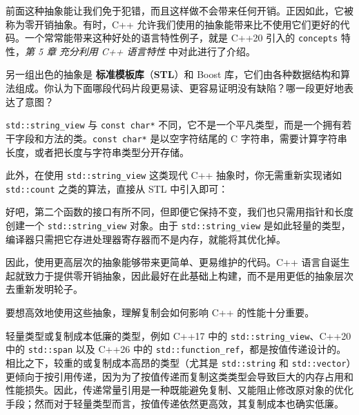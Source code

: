 前面这种抽象能让我们免于犯错，而且这样做不会带来任何开销。正因如此，它被称为零开销抽象。有时，C++ 允许我们使用的抽象能带来比不使用它们更好的代码。一个常常能带来这种好处的语言特性例子，就是 C++20 引入的 \texttt{concepts} 特性，\emph{第 5 章} \emph{充分利用 C++ 语言特性} 中对此进行了介绍。

\label{idx:030}
另一组出色的抽象是 \textbf{标准模板库}（\textbf{STL}）和 Boost 库，它们由各种数据结构和算法组成。你认为下面哪段代码片段更易读、更容易证明没有缺陷？哪一段更好地表达了意图？

\texttt{std::\allowbreak{}string\_\allowbreak{}view} 与 \texttt{const char*} 不同，它不是一个平凡类型，而是一个拥有若干字段和方法的类。\texttt{const char*} 是以空字符结尾的 C 字符串，需要计算字符串长度，或者把长度与字符串类型分开存储。

\label{idx:031}
此外，在使用 \texttt{std::\allowbreak{}string\_\allowbreak{}view} 这类现代 C++ 抽象时，你无需重新实现诸如 \texttt{std::\allowbreak{}count} 之类的算法，直接从 STL 中引入即可：


好吧，第二个函数的接口有所不同，但即便它保持不变，我们也只需用指针和长度创建一个 \texttt{std::\allowbreak{}string\_\allowbreak{}view} 对象。由于 \texttt{std::\allowbreak{}string\_\allowbreak{}view} 是如此轻量的类型，编译器只需把它存进处理器寄存器而不是内存，就能将其优化掉。

因此，使用更高层次的抽象能够带来更简单、更易维护的代码。C++ 语言自诞生起就致力于提供零开销抽象，因此最好在此基础上构建，而不是用更低的抽象层次去重新发明轮子。

要想高效地使用这些抽象，理解复制会如何影响 C++ 的性能十分重要。

轻量类型或复制成本低廉的类型，例如 C++17 中的 \texttt{std::\allowbreak{}string\_\allowbreak{}view}、C++20 中的 \texttt{std::span} 以及 C++26 中的 \texttt{std::\allowbreak{}function\_\allowbreak{}ref}，都是按值传递设计的。相比之下，较重的或复制成本高昂的类型（尤其是 \texttt{std::\allowbreak{}string} 和 \texttt{std::\allowbreak{}vector}）更倾向于按引用传递，因为为了按值传递而复制这类类型会导致巨大的内存占用和性能损失。因此，传递常量引用是一种既能避免复制、又能阻止修改原对象的优化手段；然而对于轻量类型而言，按值传递依然更高效，其复制成本也确实低廉。

